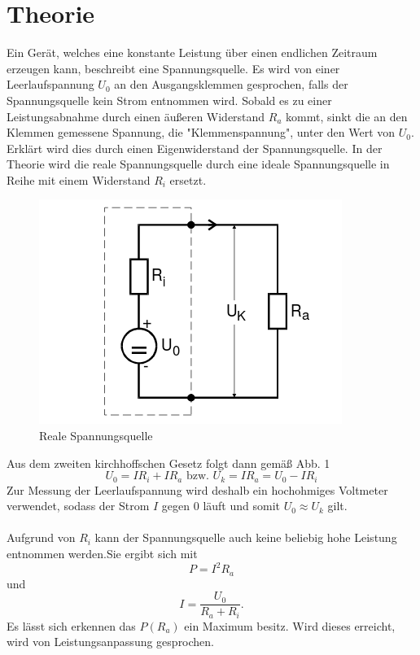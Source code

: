 \section{Theorie}
\label{sec:Theorie}

Ein Gerät, welches eine konstante Leistung über
einen endlichen Zeitraum erzeugen kann, beschreibt eine Spannungsquelle. Es wird von einer Leerlaufspannung $ U_0 $
an den Ausgangsklemmen gesprochen, falls der Spannungsquelle kein Strom entnommen wird.
Sobald es zu einer Leistungsabnahme durch einen äußeren Widerstand $ R_a $ kommt,
sinkt die an den Klemmen gemessene Spannung, die "Klemmenspannung", unter den Wert von $ U_0 $. Erklärt wird
dies durch einen Eigenwiderstand der Spannungsquelle. In der Theorie wird die reale
Spannungsquelle durch eine ideale Spannungsquelle in Reihe mit einem Widerstand $ R_i$
ersetzt.
\begin{figure}[H]
  \centering

  \includegraphics[width=\linewidth-200pt,height=\textheight-200pt,keepaspectratio]{content/Spannungsquelle1.png}
  \caption{Reale Spannungsquelle}
  \label{fig:Spannung1}
\end{figure}

Aus dem zweiten kirchhoffschen Gesetz folgt dann gemäß Abb. 1
\begin{equation}
	 U_0 = I R_i + I R_a  \text{ bzw. } U_k = I R_a = U_0-IR_i
\end{equation}
Zur Messung der Leerlaufspannung wird deshalb ein hochohmiges Voltmeter verwendet,
sodass der Strom $I$ gegen $0$ läuft und somit $U_0 \approx U_k$ gilt.\\
\\
Aufgrund von $R_i$ kann der Spannungsquelle auch keine beliebig hohe Leistung
entnommen werden.Sie ergibt sich mit
\begin{equation}
  P = I^2 R_a
  \end{equation}
  und
\begin{equation}
   I =\frac{U_0}{R_a+R_i}\text{.}
 \end{equation}
  Es lässt sich erkennen das $P(R_a)$
  ein Maximum besitz. Wird dieses erreicht, wird von Leistungsanpassung gesprochen.
